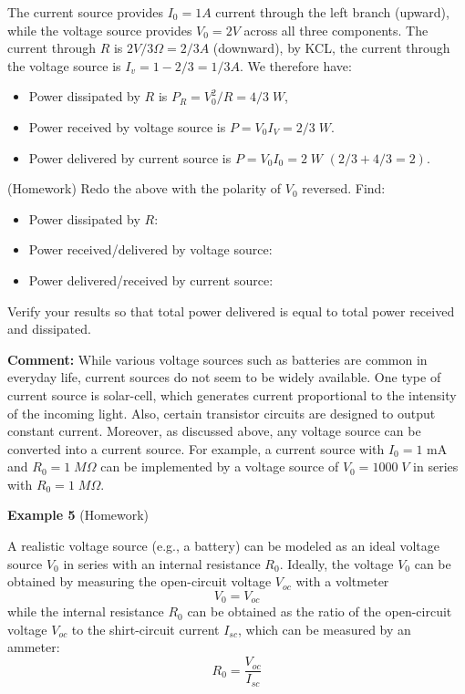 \documentclass{article}
\begin{document}

The current source provides $I_0=1A$ current through the left branch 
(upward), while the voltage source provides $V_0=2V$ across all three
components. The current through $R$ is $2V/3\Omega=2/3A$ (downward), 
by KCL, the current through the voltage source is $I_v=1-2/3=1/3A$. 
We therefore have:

\begin{itemize}
\item Power dissipated by $R$ is $P_R=V_0^2/R=4/3\;W$,
\item Power received by voltage source is $P=V_0I_V=2/3\;W$.
\item Power delivered by current source is $P=V_0I_0=2\;W$ $(2/3+4/3=2)$.
\end{itemize}

(Homework) Redo the above with the polarity of $V_0$ reversed. Find:
\begin{itemize}
\item Power dissipated by $R$: 
\item Power received/delivered by voltage source:
\item Power delivered/received by current source:
\end{itemize}
Verify your results so that total power delivered is equal to total
power received and dissipated.


{\bf Comment:} While various voltage sources such as batteries are common 
in everyday life, current sources do not seem to be widely available. One
type of current source is solar-cell, which generates current proportional
to the intensity of the incoming light. Also, certain transistor circuits
are designed to output constant current. Moreover, as discussed above, any
voltage source can be converted into a current source. For example, a 
current source with $I_0=1$ mA and $R_0=1\;M\Omega$ can be implemented
by a voltage source of $V_0=1000\; V$ in series with $R_0=1\;M\Omega$.


{\bf Example 5} (Homework)


A realistic voltage source (e.g., a battery) can be modeled as an ideal 
voltage source $V_0$ in series with an internal resistance $R_0$. Ideally,
the voltage $V_0$ can be obtained by measuring the open-circuit voltage 
$V_{oc}$ with a voltmeter
\begin{equation} 
  V_0=V_{oc} 
\end{equation}
while the internal resistance $R_0$ can be obtained as the ratio of the 
open-circuit voltage $V_{oc}$ to the shirt-circuit current $I_{sc}$, which 
can be measured by an ammeter:
\begin{equation}
  R_0=\frac{V_{oc}}{I_{sc}} 
\end{equation}
\end{document}
